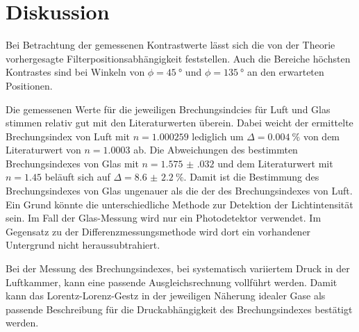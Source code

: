 \section{Diskussion}
\label{sec:Diskussion}


Bei Betrachtung der gemessenen Kontrastwerte lässt sich die von der Theorie vorhergesagte Filterpositionsabhängigkeit feststellen. 
Auch die Bereiche höchsten Kontrastes sind bei Winkeln von $\phi = \SI{45}{\degree}$ und $\phi = \SI{135}{\degree}$ an den erwarteten Positionen.


Die gemessenen Werte für die jeweiligen Brechungsindcies für Luft und Glas stimmen relativ gut mit den Literaturwerten überein.
Dabei weicht der ermittelte Brechungsindex von Luft mit $n = \num{1.000259}$ lediglich um $\Delta = \SI{0.004}{\percent}$ von dem Literaturwert \cite{Dem2} von $n = \num{1.0003}$ ab.
Die Abweichungen des bestimmten Brechungsindexes von Glas mit $n = \num{1.575(032)}$ und dem Literaturwert \cite{Dem2} mit $n = \num{1.45}$ beläuft sich auf $\Delta = \SI{8.6(22)}{\percent}$.
Damit ist die Bestimmung des Brechungsindexes von Glas ungenauer als die der des Brechungsindexes von Luft. 
Ein Grund könnte die unterschiedliche Methode zur Detektion der Lichtintensität sein. 
Im Fall der Glas-Messung wird nur ein Photodetektor verwendet. 
Im Gegensatz zu der Differenzmessungsmethode wird dort ein vorhandener Untergrund nicht heraussubtrahiert.


Bei der Messung des Brechungsindexes, bei systematisch variiertem Druck in der Luftkammer, kann eine passende Ausgleichsrechnung vollführt werden. 
Damit kann das Lorentz-Lorenz-Gestz in der jeweiligen Näherung idealer Gase als passende Beschreibung für die Druckabhängigkeit des Brechungsindexes bestätigt werden.



